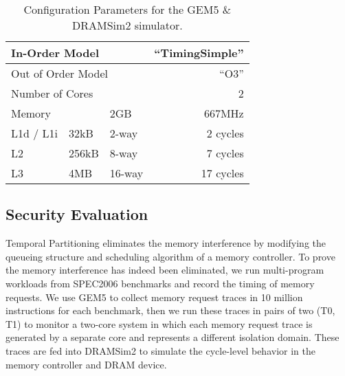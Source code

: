 \begin{table}
    \caption{Configuration Parameters for the GEM5 \& DRAMSim2 simulator.}
    \begin{tabular}{|l|l|l|r|}
        \hline
        \multicolumn{3}{|l|}{In-Order Model}     & ``TimingSimple'' \\\hline
        \multicolumn{3}{|l|}{Out of Order Model} & ``O3''           \\\hline
        \multicolumn{3}{|l|}{Number of Cores}    & 2                \\\hline
        \hline
        \multicolumn{2}{|l|}{Memory}             & 2GB    & 667MHz  \\\hline
        \hline
        L1d / L1i          & 32kB   & 2-way  & 2 cycles\\\hline
        L2                 & 256kB  & 8-way  & 7 cycles \\\hline
        L3                 & 4MB    & 16-way & 17 cycles  \\\hline
    \end{tabular}
    \label{tab:config}
\end{table}

\subsection{Security Evaluation}
Temporal Partitioning eliminates the memory interference by modifying the 
queueing structure and scheduling algorithm of a memory controller. To prove 
the memory interference has indeed been eliminated, we run multi-program 
workloads from SPEC2006 benchmarks and record the timing of memory requests. We 
use GEM5 to collect memory request traces in 10 million instructions for each 
benchmark, then we run these traces in pairs of two (T0, T1) to monitor a 
two-core system in which each memory request trace is generated by a separate 
core and represents a different isolation domain. These traces are fed into 
DRAMSim2 to simulate the cycle-level behavior in the memory controller and DRAM 
device. 

